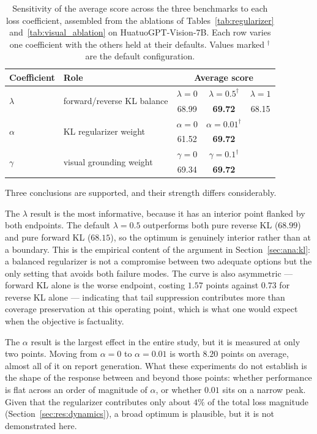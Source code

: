 \begin{table}[ht]
\centering
\small
\caption{Sensitivity of the average score across the three benchmarks to each loss coefficient, assembled from the ablations of Tables~\ref{tab:regularizer} and~\ref{tab:visual_ablation} on HuatuoGPT-Vision-7B. Each row varies one coefficient with the others held at their defaults. Values marked $^{\dagger}$ are the default configuration.}
\label{tab:sensitivity}
\begin{tabular}{llccc}
\toprule
\textbf{Coefficient} & \textbf{Role} & \multicolumn{3}{c}{\textbf{Average score}} \\
\midrule
\multirow{2}{*}{$\lambda$} & \multirow{2}{*}{forward/reverse KL balance}
  & $\lambda{=}0$ & $\lambda{=}0.5^{\dagger}$ & $\lambda{=}1$ \\
  & & 68.99 & \textbf{69.72} & 68.15 \\
\midrule
\multirow{2}{*}{$\alpha$} & \multirow{2}{*}{KL regularizer weight}
  & $\alpha{=}0$ & $\alpha{=}0.01^{\dagger}$ & \\
  & & 61.52 & \textbf{69.72} & \\
\midrule
\multirow{2}{*}{$\gamma$} & \multirow{2}{*}{visual grounding weight}
  & $\gamma{=}0$ & $\gamma{=}0.1^{\dagger}$ & \\
  & & 69.34 & \textbf{69.72} & \\
\bottomrule
\end{tabular}
\end{table}

Three conclusions are supported, and their strength differs considerably.

The $\lambda$ result is the most informative, because it has an interior point flanked by both endpoints. The default $\lambda = 0.5$ outperforms both pure reverse KL ($68.99$) and pure forward KL ($68.15$), so the optimum is genuinely interior rather than at a boundary. This is the empirical content of the argument in Section~\ref{sec:ana:kl}: a balanced regularizer is not a compromise between two adequate options but the only setting that avoids both failure modes. The curve is also asymmetric --- forward KL alone is the worse endpoint, costing $1.57$ points against $0.73$ for reverse KL alone --- indicating that tail suppression contributes more than coverage preservation at this operating point, which is what one would expect when the objective is factuality.

The $\alpha$ result is the largest effect in the entire study, but it is measured at only two points. Moving from $\alpha = 0$ to $\alpha = 0.01$ is worth $8.20$ points on average, almost all of it on report generation. What these experiments do not establish is the shape of the response between and beyond those points: whether performance is flat across an order of magnitude of $\alpha$, or whether $0.01$ sits on a narrow peak. Given that the regularizer contributes only about $4\%$ of the total loss magnitude (Section~\ref{sec:res:dynamics}), a broad optimum is plausible, but it is not demonstrated here.

